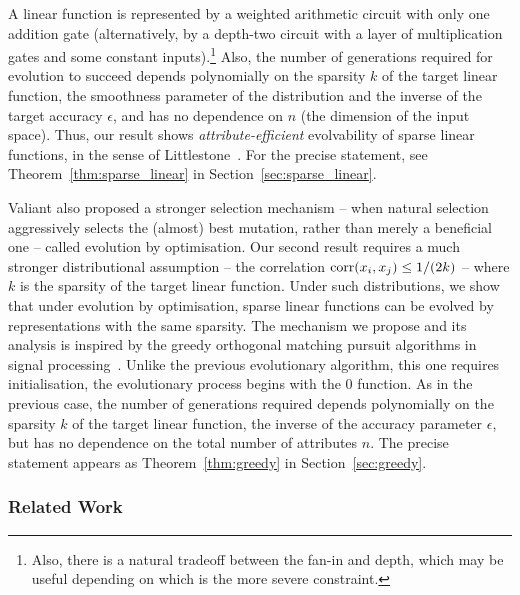 A linear function is represented by a weighted arithmetic circuit with only one
addition gate (alternatively, by a depth-two circuit with a layer of
multiplication gates and some constant inputs).\footnote{Also, there is a
natural tradeoff between the fan-in and depth, which may be useful depending on
which is the more severe constraint.}
Also, the number of generations required for evolution to succeed depends
polynomially on the sparsity $k$ of the target linear function, the smoothness
parameter of the distribution and the inverse of the target accuracy $\epsilon$,
and has no dependence on $n$ (the dimension of the input space). Thus, our
result shows \emph{attribute-efficient} evolvability of sparse linear functions,
in the sense of Littlestone~\cite{Littlestone:1988}.  For the precise statement,
see Theorem~\ref{thm:sparse_linear} in Section~\ref{sec:sparse_linear}.

Valiant also proposed a stronger selection mechanism -- when natural selection
aggressively selects the (almost) best mutation, rather than merely a beneficial
one -- called evolution by optimisation. Our second result requires a much
stronger distributional assumption -- the correlation $\mathrm{corr}(x_i, x_j) \leq
1/(2k)$ -- where $k$ is the sparsity of the target  linear function.  Under such
distributions, we show that under evolution by optimisation, sparse linear
functions can be evolved by representations with the same sparsity. The
mechanism we propose and its analysis is inspired by the greedy orthogonal
matching pursuit algorithms in signal
processing~\cite{Donoho:2006-recovery,Tropp:2004-greed}. Unlike the previous
evolutionary algorithm, this one requires initialisation, \ie the evolutionary
process begins with the $0$ function. As in the previous case, the number of
generations required depends polynomially on the sparsity $k$ of the target
linear function, the inverse of the accuracy parameter $\epsilon$, but has no
dependence on the total number of attributes $n$. The precise statement appears
as Theorem~\ref{thm:greedy} in Section~\ref{sec:greedy}. 

\subsubsection*{Related Work}

